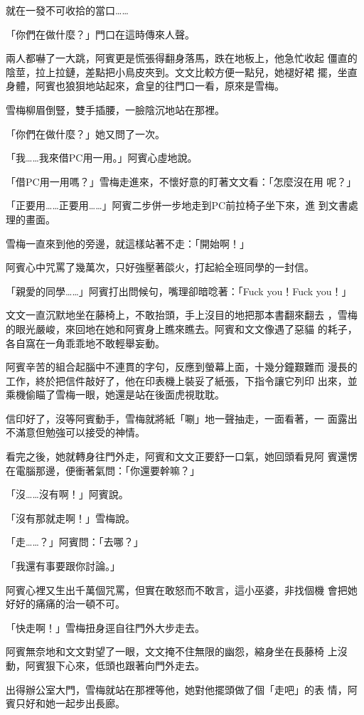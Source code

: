 就在一發不可收拾的當口……

「你們在做什麼？」門口在這時傳來人聲。

兩人都嚇了一大跳，阿賓更是慌張得翻身落馬，跌在地板上，他急忙收起
僵直的陰莖，拉上拉鏈，差點把小鳥皮夾到。文文比較方便一點兒，她褪好裙
擺，坐直身體，阿賓也狼狽地站起來，倉皇的往門口一看，原來是雪梅。

雪梅柳眉倒豎，雙手插腰，一臉陰沉地站在那裡。

「你們在做什麼？」她又問了一次。

「我……我來借PC用一用。」阿賓心虛地說。

「借PC用一用嗎？」雪梅走進來，不懷好意的盯著文文看：「怎麼沒在用
呢？」

「正要用……正要用……」阿賓二步併一步地走到PC前拉椅子坐下來，進
到文書處理的畫面。

雪梅一直來到他的旁邊，就這樣站著不走：「開始啊！」

阿賓心中咒罵了幾萬次，只好強壓著燄火，打起給全班同學的一封信。

「親愛的同學……」阿賓打出問候句，嘴理卻暗唸著：「Fuck you！Fuck
you！」

文文一直沉默地坐在藤椅上，不敢抬頭，手上沒目的地把那本書翻來翻去
，雪梅的眼光嚴峻，來回地在她和阿賓身上瞧來瞧去。阿賓和文文像遇了惡貓
的耗子，各自窩在一角乖乖地不敢輕舉妄動。

阿賓辛苦的組合起腦中不連貫的字句，反應到螢幕上面，十幾分鐘艱難而
漫長的工作，終於把信件敲好了，他在印表機上裝妥了紙張，下指令讓它列印
出來，並乘機偷瞄了雪梅一眼，她還是站在後面虎視耽耽。

信印好了，沒等阿賓動手，雪梅就將紙「唰」地一聲抽走，一面看著，一
面露出不滿意但勉強可以接受的神情。

看完之後，她就轉身往門外走，阿賓和文文正要舒一口氣，她回頭看見阿
賓還愣在電腦那邊，便衝著氣問：「你還要幹嘛？」

「沒……沒有啊！」阿賓說。

「沒有那就走啊！」雪梅說。

「走……？」阿賓問：「去哪？」

「我還有事要跟你討論。」

阿賓心裡又生出千萬個咒罵，但實在敢怒而不敢言，這小巫婆，非找個機
會把她好好的痛痛的治一頓不可。

「快走啊！」雪梅扭身逕自往門外大步走去。

阿賓無奈地和文文對望了一眼，文文掩不住無限的幽怨，縮身坐在長藤椅
上沒動，阿賓狠下心來，低頭也跟著向門外走去。

出得辦公室大門，雪梅就站在那裡等他，她對他擺頭做了個「走吧」的表
情，阿賓只好和她一起步出長廊。

